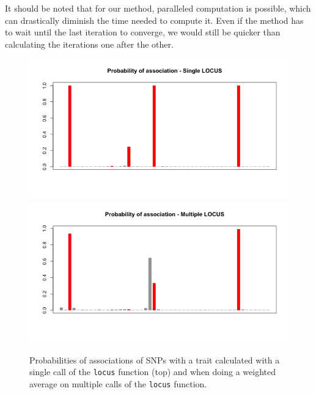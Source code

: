 \documentclass[a4paper, 11pt]{report}
\numberwithin{equation}{chapter}
\begin{document}
It should be noted that for our method, paralleled computation is possible, which can drastically diminish the time needed to compute it. Even if the method has to wait until the last iteration to converge, we would still be quicker than calculating the iterations one after the other.
\begin{figure}
\begin{center}
\includegraphics[width=5in]{images/s_locus.png}
\includegraphics[width=5in]{images/m_locus.png}
\end{center}
\caption{\label{fig:simple_locus}Probabilities of associations of SNPs with a trait calculated with a single call of the \texttt{locus} function (top) and when doing a weighted average on multiple calls of the \texttt{locus} function.}
\end{figure}
\end{document}
